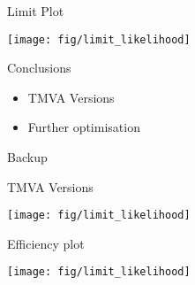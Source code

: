 \documentclass[t, 8pt]{beamer}
\begin{document}
\begin{frame}{Limit Plot}
\begin{center}
    \texttt{[image: fig/limit\_likelihood]}
\end{center}
\end{frame}

\begin{frame}{Conclusions}

  \begin{itemize}  
  \item TMVA Versions
  \item Further optimisation
  \end{itemize}
\end{frame}

\begin{frame}{Backup}
\end{frame}

\begin{frame}{TMVA Versions}
\begin{center}
    \texttt{[image: fig/limit\_likelihood]}
\end{center}
\end{frame}

\begin{frame}{Efficiency plot}
\begin{center}
    \texttt{[image: fig/limit\_likelihood]}
\end{center}
\end{frame}
\end{document}
